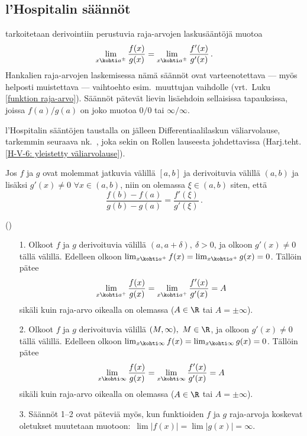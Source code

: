 \subsection{l'Hospitalin säännöt}

 tarkoitetaan derivointiin perustuvia raja-arvojen
laskusääntöjä muotoa
\[
\lim_{x \kohti a^\pm} \frac{f(x)}{g(x)} = \lim_{x \kohti a^\pm} \frac{f'(x)}{g'(x)}\,.
\]
Hankalien raja-arvojen laskemisessa nämä säännöt ovat varteenotettava --- myös helposti
muistettava --- vaihtoehto esim.\ muuttujan vaihdolle (vrt.\ Luku \ref{funktion raja-arvo}).
Säännöt pätevät lievin lisäehdoin sellaisissa tapauksissa, joissa $f(a)/g(a)$ on joko muotoa
$0/0$ tai $\infty/\infty$.

l'Hospitalin sääntöjen taustalla on jälleen Differentiaalilaskun väliarvolause, tarkemmin
seuraava nk.\ , joka sekin on Rollen lauseesta johdettavissa
(Harj.teht.\,\ref{H-V-6: yleistetty väliarvolause}).
\begin{Lause} \label{yleistetty väliarvolause} 
 Jos $f$ ja $g$ ovat
molemmat jatkuvia välillä $[a,b]$ ja derivoituvia välillä $(a,b)$ ja lisäksi $g'(x) \neq 0$
$\forall x\in(a,b)$, niin on olemassa $\xi\in(a,b)$ siten, että
\[
\frac{f(b)-f(a)}{g(b)-g(a)} = \frac{f'(\xi)}{g'(\xi)}\,.
\]
\end{Lause}
\begin{Lause} () \label{Hospital} 
\begin{itemize}
\item[1.] Olkoot $f$ ja $g$ derivoituvia välillä $(a,a+\delta),\ \delta>0$, ja olkoon
          $g'(x) \neq 0$ tällä välillä. Edelleen olkoon
          $\lim_{x \kohti a^+}f(x)=\lim_{x \kohti a^+}g(x) = 0$. Tällöin pätee
          \[
          \lim_{x \kohti a^+} \frac{f(x)}{g(x)} = \lim_{x \kohti a^+} \frac{f'(x)}{g'(x)} = A
          \]
          sikäli kuin raja-arvo oikealla on olemassa ($A\in\R$ tai $A=\pm\infty$).
\item[2.] Olkoot $f$ ja $g$ derivoituvia välillä $(M,\infty),\ M\in\R$, ja olkoon
          $g'(x) \neq 0$ tällä välillä. Edelleen olkoon
          $\lim_{x\kohti\infty}f(x)=\lim_{x\kohti\infty}g(x)=0$. Tällöin pätee
          \[
          \lim_{x\kohti\infty} \frac{f(x)}{g(x)} = \lim_{x\kohti\infty} \frac{f'(x)}{g'(x)} = A
          \]
          sikäli kuin raja-arvo oikealla on olemassa ($A\in\R$ tai $A=\pm\infty$).
\item[3.] Säännöt 1--2 ovat päteviä myös, kun funktioiden $f$ ja $g$ raja-arvoja koskevat
          oletukset muutetaan muotoon: $\,\lim|f(x)|=\lim|g(x)|=\infty$.
\end{itemize}
\end{Lause}

